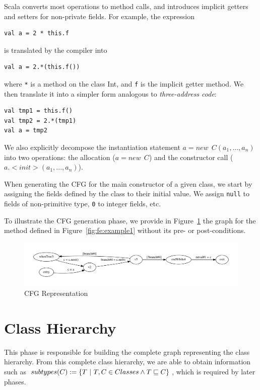 Scala converts most operations to method calls, and introduces implicit getters
and setters for non-private fields. For example, the expression 
\begin{lstlisting}
val a = 2 * this.f
\end{lstlisting}
is translated by the compiler into 
\begin{lstlisting}
val a = 2.*(this.f())
\end{lstlisting}
where \lstinline{*} is a method on the class Int, and \lstinline{f} is the implicit
getter method. We then translate it into a simpler form analogous to
\emph{three-address code}:
\begin{lstlisting}
val tmp1 = this.f()
val tmp2 = 2.*(tmp1)
val a = tmp2
\end{lstlisting}

We also explicitly decompose the instantiation statement $a = new~~ C(a_1, ...,
a_n)$ into two operations: the allocation ($a = new~~ C$) and the constructor
call ($a.<init>(a_1, ..., a_n)$).

When generating the CFG for the main constructor of a given class, we start
by assigning the fields defined by the class to their initial value. We assign
\lstinline{null} to fields of non-primitive type, \lstinline{0} to integer
fields, etc.

To illustrate the CFG generation phase, we provide in
Figure~\ref{fig:cfg:example1} the graph for the method defined in
Figure~\ref{fig:fe:example1} without its pre- or post-conditions.

\begin{figure}[h]
    \centering

    \includegraphics[scale=0.50]{images/cfg_example2}

    \caption{CFG Representation}
    \label{fig:cfg:example1}
\end{figure}

\section{Class Hierarchy}
This phase is responsible for building the complete graph representing the
class hierarchy. From this complete class hierarchy, we are able to obtain
information such as $subtypes(C) := \{ T ~|~ T,C \in Classes \land T \sqsubseteq
C \}$, which is required by later phases.

